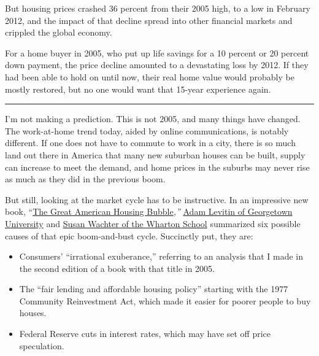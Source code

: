 But housing prices crashed 36 percent from their 2005 high, to a low in
February 2012, and the impact of that decline spread into other
financial markets and crippled the global economy.

For a home buyer in 2005, who put up life savings for a 10 percent or 20
percent down payment, the price decline amounted to a devastating loss
by 2012. If they had been able to hold on until now, their real home
value would probably be mostly restored, but no one would want that
15-year experience again.

\begin{center}\rule{0.5\linewidth}{\linethickness}\end{center}

I'm not making a prediction. This is not 2005, and many things have
changed. The work-at-home trend today, aided by online communications,
is notably different. If one does not have to commute to work in a city,
there is so much land out there in America that many new suburban houses
can be built, supply can increase to meet the demand, and home prices in
the suburbs may never rise as much as they did in the previous boom.

But still, looking at the market cycle has to be instructive. In an
impressive new book,
``\href{https://www.hup.harvard.edu/catalog.php?isbn=9780674979659}{The
Great American Housing Bubble}\emph{,''}
\href{https://www.law.georgetown.edu/faculty/adam-j-levitin/}{Adam
Levitin of Georgetown University} and
\href{https://real-estate.wharton.upenn.edu/profile/wachter/}{Susan
Wachter of the Wharton School} summarized six possible causes of that
epic boom-and-bust cycle. Succinctly put, they are:

\begin{itemize}
\tightlist
\item
  Consumers' ``irrational exuberance,'' referring to an analysis that I
  made in the second edition of a book with that title in 2005.
\end{itemize}

\begin{itemize}
\tightlist
\item
  The ``fair lending and affordable housing policy'' starting with the
  1977 Community Reinvestment Act, which made it easier for poorer
  people to buy houses.
\end{itemize}

\begin{itemize}
\tightlist
\item
  Federal Reserve cuts in interest rates, which may have set off price
  speculation.
\end{itemize}

